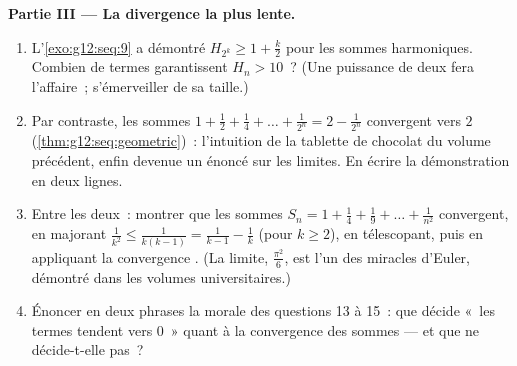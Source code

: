 \begin{problem}
\medskip
\noindent\textbf{Partie III --- La divergence la plus lente.}
\begin{enumerate}[resume]
  \item L'\cref{exo:g12:seq:9} a démontré $H_{2^k} \geq 1 +
        \frac k2$ pour les sommes harmoniques. Combien de termes
        garantissent $H_n > 10$~? (Une puissance de deux fera
        l'affaire~; s'émerveiller de sa taille.)
  \item Par contraste, les sommes 
        $1 + \frac12 + \frac14 + \dots + \frac{1}{2^n} =
        2 - \frac{1}{2^n}$ convergent vers $2$
        (\cref{thm:g12:seq:geometric})~: l'intuition de la tablette
        de chocolat du volume précédent, enfin devenue un énoncé sur
        les limites. En écrire la démonstration en deux lignes.
  \item Entre les deux~: montrer que les sommes
        $S_n = 1 + \frac{1}{4} + \frac{1}{9} + \dots +
        \frac{1}{n^2}$ convergent, en majorant
        $\frac{1}{k^2} \leq \frac{1}{k(k-1)} =
        \frac{1}{k-1} - \frac{1}{k}$ (pour $k \geq 2$), en
        télescopant, puis en appliquant la convergence . (La
        limite, $\frac{\pi^2}{6}$, est l'un des miracles d'Euler,
        démontré dans les volumes universitaires.)
  \item Énoncer en deux phrases la morale des questions 13 à 15~:
        que décide «~les termes tendent vers $0$~» quant à la
        convergence des sommes --- et que ne décide-t-elle pas~?
\end{enumerate}


\end{problem}
